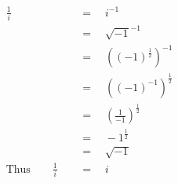 \begin{align*}
\frac{1}{i}\quad&\,=\quad i^{-1}\\
\,&\,=\quad\sqrt{-1}^{-1}\\
\,&\,=\quad\left((-1)^\frac{1}{2}\right)^{-1}\\
\,&\,=\quad\left((-1)^{-1}\right)^\frac{1}{2}\\
\,&\,=\quad\left(\frac{1}{-1}\right)^\frac{1}{2}\\
\,&\,=\quad-1^\frac{1}{2}\\
\,&\,=\quad\sqrt{-1}\\
\mathrm{Thus}\qquad\frac{1}{i}\quad&\,=\quad i
\end{align*}
